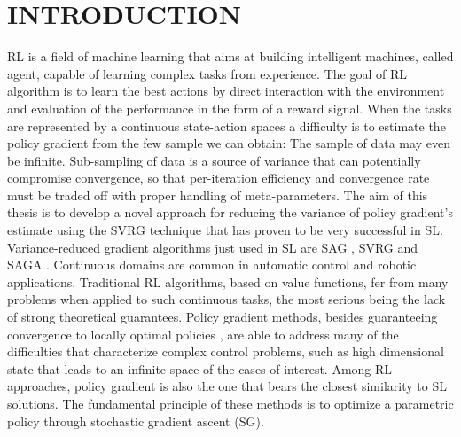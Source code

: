 \chapter{INTRODUCTION} \label{chap:aChapter}

\ac{RL} is a field of machine learning that aims at building intelligent machines, called agent, capable of learning complex tasks from experience.
The goal of \acs{RL} \cite{sutton1998reinforcement} algorithm is to learn the best actions by direct interaction with the environment and evaluation of the performance in the form of a reward signal.
When the tasks are represented by a continuous state-action spaces a difficulty is to estimate the policy gradient from the few sample we can obtain:  The sample of data may even be infinite. Sub-sampling of data is a source of variance that can potentially compromise convergence, so that per-iteration efficiency and convergence rate must be traded off with proper handling of meta-parameters.
The aim of this thesis is to develop a novel approach for reducing the variance of policy gradient's estimate using the \acs{SVRG}\cite{allen2016variance} technique that has proven to be very successful in \ac{SL}.\newline
Variance-reduced gradient algorithms just used in \acs{SL} are SAG \cite{roux2012stochastic}, SVRG \cite{allen2016variance} and SAGA \cite{defazio2014saga}.
Continuous domains are common in automatic control and robotic applications. Traditional RL algorithms, based on value functions, fer from many problems when applied to such continuous tasks, the most serious being the lack of strong theoretical guarantees. Policy gradient methods, besides guaranteeing convergence to locally optimal policies \cite{sutton2000policy}, are able to address many of the difficulties that characterize complex control problems, such as high dimensional state that leads to an infinite space of the cases of interest. 
Among RL approaches, policy gradient is also the one that bears the closest similarity to \acs{SL} solutions. The fundamental principle of these methods is to optimize a parametric policy through stochastic gradient ascent (\acs{SG}).
